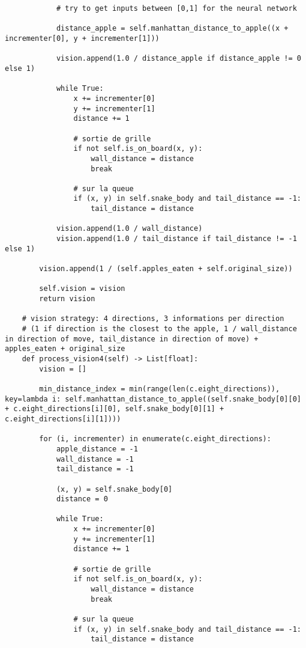 \documentclass[11pt,a4paper]{article}
\begin{document}
\begin{verbatim}
            # try to get inputs between [0,1] for the neural network

            distance_apple = self.manhattan_distance_to_apple((x + incrementer[0], y + incrementer[1]))

            vision.append(1.0 / distance_apple if distance_apple != 0 else 1)

            while True:
                x += incrementer[0]
                y += incrementer[1]
                distance += 1

                # sortie de grille
                if not self.is_on_board(x, y):
                    wall_distance = distance
                    break

                # sur la queue
                if (x, y) in self.snake_body and tail_distance == -1:
                    tail_distance = distance

            vision.append(1.0 / wall_distance)
            vision.append(1.0 / tail_distance if tail_distance != -1 else 1)

        vision.append(1 / (self.apples_eaten + self.original_size))

        self.vision = vision
        return vision

    # vision strategy: 4 directions, 3 informations per direction
    # (1 if direction is the closest to the apple, 1 / wall_distance in direction of move, tail_distance in direction of move) + apples_eaten + original_size
    def process_vision4(self) -> List[float]:
        vision = []

        min_distance_index = min(range(len(c.eight_directions)), key=lambda i: self.manhattan_distance_to_apple((self.snake_body[0][0] + c.eight_directions[i][0], self.snake_body[0][1] + c.eight_directions[i][1])))

        for (i, incrementer) in enumerate(c.eight_directions):
            apple_distance = -1
            wall_distance = -1
            tail_distance = -1

            (x, y) = self.snake_body[0]
            distance = 0

            while True:
                x += incrementer[0]
                y += incrementer[1]
                distance += 1

                # sortie de grille
                if not self.is_on_board(x, y):
                    wall_distance = distance
                    break

                # sur la queue
                if (x, y) in self.snake_body and tail_distance == -1:
                    tail_distance = distance


\end{verbatim}
\end{document}
